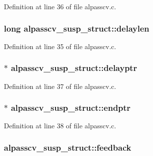 Definition at line 36 of file alpasscv.\+c.

\subsubsection[{\texorpdfstring{delaylen}{delaylen}}]{\setlength{\rightskip}{0pt plus 5cm}long alpasscv\+\_\+susp\+\_\+struct\+::delaylen}\hypertarget{structalpasscv__susp__struct_a8fcd0a98ec4ef24860b7421f2a47db47}{}\label{structalpasscv__susp__struct_a8fcd0a98ec4ef24860b7421f2a47db47}


Definition at line 35 of file alpasscv.\+c.

\subsubsection[{\texorpdfstring{delayptr}{delayptr}}]{$\ast$ alpasscv\+\_\+susp\+\_\+struct\+::delayptr}\hypertarget{structalpasscv__susp__struct_ac66a70ac40f5722cca7334e8f4568acf}{}\label{structalpasscv__susp__struct_ac66a70ac40f5722cca7334e8f4568acf}


Definition at line 37 of file alpasscv.\+c.

\subsubsection[{\texorpdfstring{endptr}{endptr}}]{$\ast$ alpasscv\+\_\+susp\+\_\+struct\+::endptr}\hypertarget{structalpasscv__susp__struct_ab29e12b413da3f90f96a125a7129a061}{}\label{structalpasscv__susp__struct_ab29e12b413da3f90f96a125a7129a061}


Definition at line 38 of file alpasscv.\+c.

\subsubsection[{\texorpdfstring{feedback}{feedback}}]{ alpasscv\+\_\+susp\+\_\+struct\+::feedback}\hypertarget{structalpasscv__susp__struct_a33f7a0bac5dcb9a7fd193a08627f1a05}{}\label{structalpasscv__susp__struct_a33f7a0bac5dcb9a7fd193a08627f1a05}


